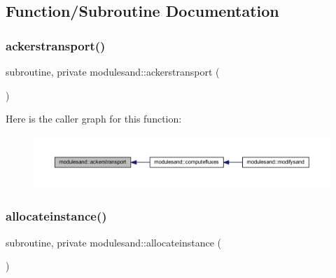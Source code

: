 \subsection{Function/\+Subroutine Documentation}
\mbox{\label{namespacemodulesand_a982128af256cc6018f1c15e9f2bed5ad}} 
\subsubsection{\texorpdfstring{ackerstransport()}{ackerstransport()}}
{\footnotesize\ttfamily subroutine, private modulesand\+::ackerstransport (\begin{DoxyParamCaption}{ }\end{DoxyParamCaption})\hspace{0.3cm}{\ttfamily [private]}}

Here is the caller graph for this function\+:\nopagebreak
\begin{figure}[H]
\begin{center}
\leavevmode
\includegraphics[width=350pt]{namespacemodulesand_a982128af256cc6018f1c15e9f2bed5ad_icgraph}
\end{center}
\end{figure}
\mbox{\label{namespacemodulesand_ad161b287427b9612e9e73f0e7cb2b2ec}} 
\subsubsection{\texorpdfstring{allocateinstance()}{allocateinstance()}}
{\footnotesize\ttfamily subroutine, private modulesand\+::allocateinstance (\begin{DoxyParamCaption}{ }\end{DoxyParamCaption})\hspace{0.3cm}{\ttfamily [private]}}

